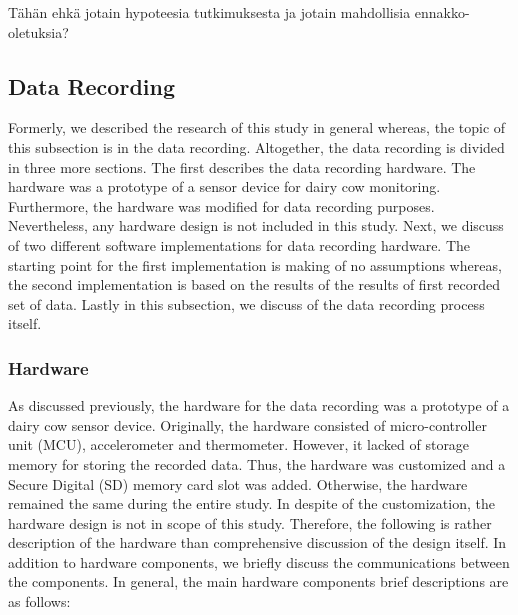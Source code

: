 \documentclass[english,12pt,a4paper,pdftex,elec,utf8]{aaltothesis}
\begin{document}
Tähän ehkä jotain hypoteesia tutkimuksesta ja jotain mahdollisia ennakko-oletuksia?



\subsection{Data Recording} \label{datarecordingsection}

Formerly, we described the research of this study in general whereas, the topic of this subsection is in the data recording. Altogether, the data recording is divided in three more sections. The first describes the data recording hardware. The hardware was a prototype of a sensor device for dairy cow monitoring. Furthermore, the hardware was modified for data recording purposes. Nevertheless, any hardware design is not included in this study. Next, we discuss of two different software implementations for data recording hardware. The starting point for the first implementation is making of no assumptions whereas, the second implementation is based on the results of the results of first recorded set of data. Lastly in this subsection, we discuss of the data recording process itself.  \\



\subsubsection{Hardware} \label{hardwaresection}

As discussed previously, the hardware for the data recording was a prototype of a dairy cow sensor device. Originally, the hardware consisted of micro-controller unit (MCU), accelerometer and thermometer. However, it lacked of storage memory for storing the recorded data. Thus, the hardware was customized and a Secure Digital (SD) memory card slot was added. Otherwise, the hardware remained the same during the entire study. In despite of the customization, the hardware design is not in scope of this study. Therefore, the following is rather description of the hardware than comprehensive discussion of the design itself. In addition to hardware components, we briefly discuss the communications between the components. In general, the main hardware components brief descriptions are as follows:
\end{document}
